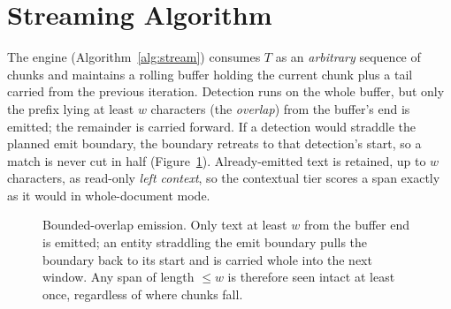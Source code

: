 \documentclass[runningheads]{llncs}
\newcommand{\T}{T}
\begin{document}
\section{Streaming Algorithm}
\label{sec:algo}

The engine (Algorithm~\ref{alg:stream}) consumes $\T$ as an \emph{arbitrary}
sequence of chunks and maintains a rolling buffer holding the current chunk plus
a tail carried from the previous iteration. Detection runs on the whole buffer,
but only the prefix lying at least $w$ characters (the \emph{overlap}) from the
buffer's end is emitted; the remainder is carried forward. If a detection would
straddle the planned emit boundary, the boundary retreats to that detection's
start, so a match is never cut in half (Figure~\ref{fig:overlap}). Already-emitted
text is retained, up to $w$ characters, as read-only \emph{left context}, so the
contextual tier scores a span exactly as it would in whole-document mode.

\begin{figure}[t]
\centering
{}
\caption{Bounded-overlap emission. Only text at least $w$ from the buffer end is
emitted; an entity straddling the emit boundary pulls the boundary back to its
start and is carried whole into the next window. Any span of length $\le w$ is
therefore seen intact at least once, regardless of where chunks fall.}
\label{fig:overlap}
\end{figure}
\end{document}
